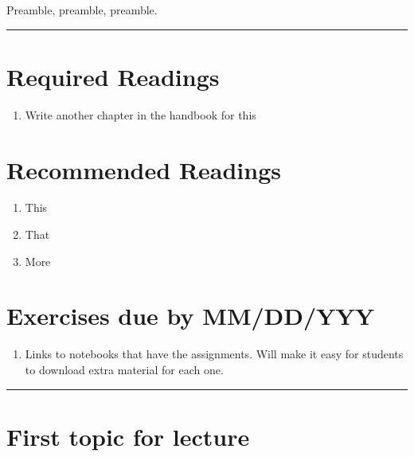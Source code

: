 \documentclass[]{book}
\providecommand{\tightlist}{%
  \setlength{\itemsep}{0pt}\setlength{\parskip}{0pt}}
\begin{document}
Preamble, preamble, preamble.

\begin{center}\rule{0.5\linewidth}{\linethickness}\end{center}

\hypertarget{required-readings-2}{%
\section*{Required Readings}\label{required-readings-2}}

\begin{enumerate}
\def\labelenumi{\arabic{enumi}.}
\tightlist
\item
  Write another chapter in the handbook for this
\end{enumerate}

\hypertarget{recommended-readings-2}{%
\section*{Recommended Readings}\label{recommended-readings-2}}

\begin{enumerate}
\def\labelenumi{\arabic{enumi}.}
\tightlist
\item
  This
\item
  That
\item
  More
\end{enumerate}

\hypertarget{exercises-due-by-mmddyyy-2}{%
\section*{Exercises due by MM/DD/YYY}\label{exercises-due-by-mmddyyy-2}}

\begin{enumerate}
\def\labelenumi{\arabic{enumi}.}
\tightlist
\item
  Links to notebooks that have the assignments. Will make it
  easy for students to download extra material for each one.
\end{enumerate}

\begin{center}\rule{0.5\linewidth}{\linethickness}\end{center}

\hypertarget{first-topic-for-lecture-2}{%
\section{First topic for lecture}\label{first-topic-for-lecture-2}}
\end{document}
